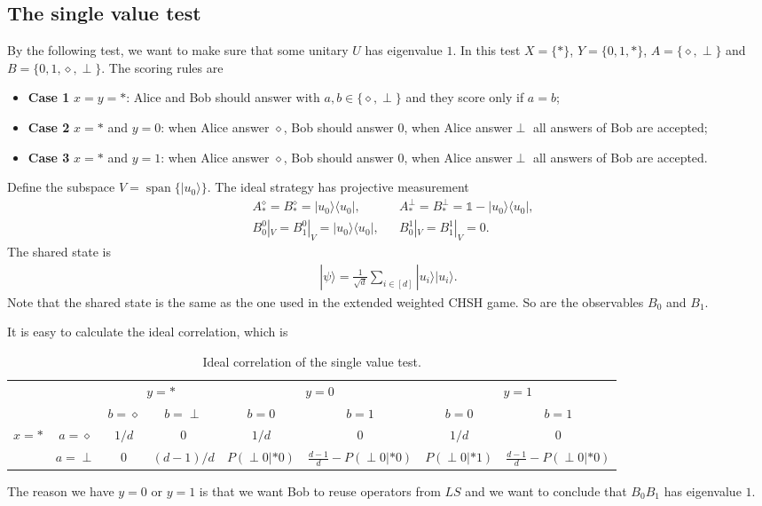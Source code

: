\documentclass[11pt,letterpaper]{article}
\newcommand{\ket}[1]{|#1\rangle}
\newcommand{\ketbra}[2]{|#1\rangle\langle#2|}
\DeclareMathOperator{\spn}{span}
\newcommand{\1}{\mathbb{1}}
\newcommand{\LS}{LS}
\newcommand{\pr}[2]{P(#1|#2)}
\theoremstyle{definition}
\begin{document}
\subsection{The single value test}
By the following test, we want to make sure that some unitary $U$ has eigenvalue $1$.
In this test $X = \{\ast\}$, $Y = \{0,1,\ast\}$, $A = \{\diamond, \perp\}$ and $B = \{0,1, \diamond, \perp\}$.
The scoring rules are
\begin{itemize}
	\item \textbf{Case 1} $x = y = \ast$: Alice and Bob should answer with $a, b \in \{\diamond, \perp\}$ and 
	they score only if $a = b$;
	\item \textbf{Case 2} $x =\ast$ and $y = 0$: when Alice answer $\diamond$, Bob should answer $0$, when 
	Alice answer$\perp$ all answers of Bob are accepted;
	\item \textbf{Case 3} $x = \ast$ and $y = 1$: when Alice answer $\diamond$, Bob should answer $0$, when 
	Alice answer$\perp$ all answers of Bob are accepted.
\end{itemize}

Define the subspace $V = \spn\{ \ket{u_0} \}$.
The ideal strategy has projective measurement 
\begin{align*}
&A_\ast^\diamond = B_\ast^\diamond= \ketbra{u_0}{u_0}, 
&&A_\ast^\perp = B_\ast^\perp = \1 - \ketbra{u_0}{u_0},\\
&B_0^0|_V = B_1^0|_V = \ketbra{u_0}{u_0}, 
&&B_0^1|_V = B_1^1|_V = 0.
\end{align*}
The shared state is 
\begin{align}
	\ket{\psi} = \frac{1}{\sqrt{d}} \sum_{i \in [d]} \ket{u_i}\ket{u_i}.
\end{align}
Note that the shared state is the same as the one used in the extended weighted CHSH game.
So are the observables $B_0$ and $B_1$.

It is easy to calculate the ideal correlation, which is
\begin{table}[H]
\begin{center}
\begin{tabular}{|c|c||c|c|c|c|c|c|}
\hline
\multicolumn{2}{|c|}{} &
\multicolumn{2}{|c|}{$y=\ast$} &
\multicolumn{2}{|c|}{$y=0$} &
\multicolumn{2}{|c|}{$y=1$}\\
\cline{3-8}
\multicolumn{2}{|c|}{} &$b = \diamond$ & $b = \perp$ & $b = 0$ & $b = 1$ & $b = 0$ & $b = 1$\\
\hline
\hline
\multirow{2}{*}{$x = \ast$} & $a=\diamond$ & $1/d$ & 0 & $1/d$ & 0 & $1/d$ & 0 \\
\cline{2-8}
&$a=\perp$ & 0 & $(d-1)/d$ & \small $\pr{\perp0}{\ast0}$ & \small $\frac{d-1}{d} -\pr{\perp0}{\ast0}$  
& \small $\pr{\perp0}{\ast1}$ & \small $\frac{d-1}{d}- \pr{\perp0}{\ast0}$  \\
\hline
\end{tabular}
\caption{Ideal correlation of the single value test.}
\end{center}
\end{table}
The reason we have $y=0$ or $y=1$ is that we want Bob to reuse operators from $\LS$ and we want to
conclude that $B_0B_1$ has eigenvalue $1$.
\end{document}
